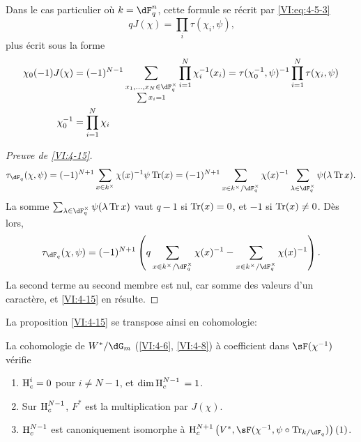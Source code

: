 Dans le cas particulier où $k=\dF_q^n$, cette formule se récrit par 
\eqref{VI:eq:4-5-3} 
\begin{equation*}\tag{4.15.1}\label{VI:eq:4-15-1}
  q J(\chi) = \prod_i \tau(\chi_i,\psi) \text{,} 
\end{equation*}
plus écrit sous la forme 
\begin{align*}
  \chi_0(-1) J(\chi) &= (-1)^{N-1} \sum_{\substack{x_1,\dots,x_N\in \dF_q^\times \\ \sum x_i = 1}} \prod_{i=1}^N \chi_i^{-1}(x_i) = \tau(\chi_0^{-1},\psi)^{-1} \prod_{i=1}^N \tau(\chi_i,\psi) \\
  \chi_0^{-1} &= \prod_{i=1}^N \chi_i 
\end{align*}





\begin{proof}[Preuve de \ref{VI:4-15}]
\[
  \tau_{\dF_q}(\chi,\psi) = (-1)^{N+1} \sum_{x\in k^\times} \chi(x)^{-1} \psi \tr(x) = (-1)^{N+1} \sum_{x\in k^\times/\dF_q^\times} \chi(x)^{-1} \sum_{\lambda\in \dF_q^\times} \psi(\lambda \tr x) \text{.}
\]
La somme $\sum_{\lambda\in \dF_q^\times} \psi(\lambda \tr x)$ vaut $q-1$ si 
$\operatorname{Tr}(x)=0$, et $-1$ si $\operatorname{Tr}(x)\ne 0$. Dès lors, 
\[
  \tau_{\dF_q}(\chi,\psi) = (-1)^{N+1} \left(q\sum_{x\in k^\times/\dF_q^\times} \chi(x)^{-1} - \sum_{x\in k^\times/\dF_q^\times} \chi(x)^{-1}\right) \text{.}
\]
La second terme au second membre est nul, car somme des valeurs d'un 
caractère, et \ref{VI:4-15} en résulte. 
\end{proof}

La proposition \ref{VI:4-15} se transpose ainsi en cohomologie: 





\begin{proposition_}\label{VI:4-16}
La cohomologie de $W^\ast/\dG_m$ (\ref{VI:4-6}, \ref{VI:4-8}) à coefficient 
dans $\sF(\chi^{-1})$ vérifie 
\begin{enumerate}[\indent (i)]
  \item $\operatorname{H}_c^i=0$ pour $i\ne N-1$, et $\dim \operatorname{H}_c^{N-1}{}=1$. 
  \item Sur $\operatorname{H}_c^{N-1}$, $F^\ast$ est la multiplication par $J(\chi)$. 
  \item $\operatorname{H}_c^{N-1}$ est canoniquement isomorphe à 
    $\h_c^{N+1}\left(V^\ast,\sF(\chi^{-1},\psi\circ \tr_{k/\dF_q})\right)(1)$. 
\end{enumerate}
\end{proposition_}

